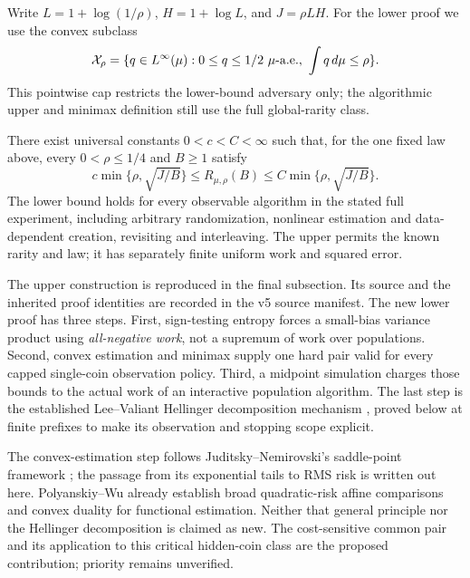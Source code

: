 Write $L=1+\log(1/\rho)$, $H=1+\log L$, and $J=\rho LH$.
For the lower proof we use the convex subclass
\[
 \Xrho=\{q\in L^\infty(\mu):0\le q\le1/2\ \mu\text{-a.e.},\ \int q\,d\mu\le\rho\}.
\]
This pointwise cap restricts the lower-bound adversary only; the algorithmic
upper and minimax definition still use the full global-rarity class.

\begin{theorem}\label{crit:thm:critical-minimax}
There exist universal constants $0<c<C<\infty$ such that, for the one fixed
law above, every $0<\rho\le1/4$ and $B\ge1$ satisfy
\[
 c\min\{\rho,\sqrt{J/B}\}\le R_{\mu,\rho}(B)
       \le C\min\{\rho,\sqrt{J/B}\}.                    \tag{C.A}
\]
The lower bound holds for every observable algorithm in the stated full
experiment, including arbitrary randomization, nonlinear estimation and
data-dependent creation, revisiting and interleaving. The upper permits the
known rarity and law; it has separately finite uniform work and squared error.
\end{theorem}

The upper construction is reproduced in the final subsection. Its source
and the inherited proof identities are recorded in the v5 source manifest. The new lower proof has three
steps. First, sign-testing entropy forces a small-bias variance product using
\emph{all-negative work}, not a supremum of work over populations. Second,
convex estimation and minimax supply one hard pair valid for every capped
single-coin observation policy. Third, a midpoint simulation charges those
bounds to the actual work of an interactive population algorithm. The last
step is the established Lee--Valiant Hellinger decomposition mechanism
\cite[Lemma 17]{leevaliant}, proved below at finite prefixes to make its observation
and stopping scope explicit.

The convex-estimation step follows Juditsky--Nemirovski's saddle-point
framework \cite{jn}; the passage from its exponential tails to RMS risk is
written out here. Polyanskiy--Wu \cite{pw} already establish broad quadratic-risk
affine comparisons and convex duality for functional estimation. Neither that
general principle nor the Hellinger decomposition is claimed as new. The
cost-sensitive common pair and its application to this critical hidden-coin
class are the proposed contribution; priority remains unverified.

